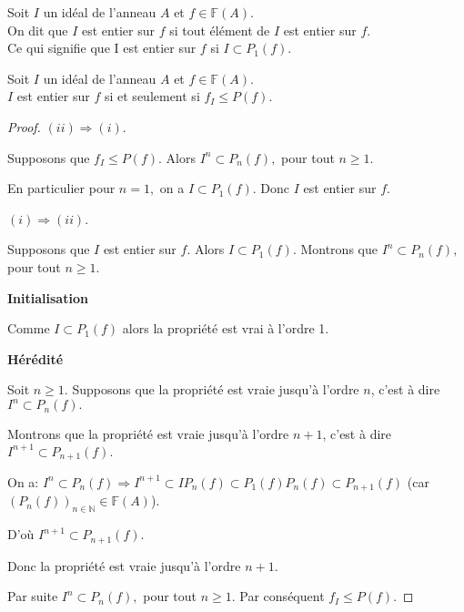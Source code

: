 \begin{madefinition}
	Soit $I$ un idéal de l'anneau $A$ et $f \in \mathbb{F}(A)$. \\
	On dit que $I$ est entier sur $f$ si tout élément de $I$ est entier sur $f$. \\
	Ce qui signifie que I est entier sur $f$ si $I \subset P_1(f)$.
\end{madefinition}
\begin{maconsequence}
	Soit $I$ un idéal de l'anneau $A$ et $f \in \mathbb{F}(A)$. \\
	$I$ est entier sur $f$ si et seulement si $f_I \leqslant P(f)$.
\end{maconsequence}
\begin{proof}
	$(ii)\Longrightarrow (i)$.
	
	Supposons que $f_{I}\leq P(f).$ Alors $I^{n}\subset P_{n}(f),$ pour tout $n\geq 1.$
	
	En particulier pour $n=1,$ on a $I\subset P_{1}(f).$ Donc $I$ est entier sur $f.$
	
	$(i)\Longrightarrow (ii)$.
	
	Supposons que $I$ est entier sur $f.$ Alors $I\subset P_{1}(f).$ Montrons que $I^{n}\subset P_{n}(f),$ pour tout $n\geq 1.$
	
	\textbf{Initialisation}
	
	Comme $I\subset P_{1}(f)$ alors la propriété est vrai à l'ordre 1.
	
	\textbf{Hérédité}
	
	Soit $n\geq 1.$ Supposons que la propriété est vraie jusqu'à l'ordre $n$, c'est à dire $I^{n}\subset P_{n}(f).$
	
	Montrons que la propriété est vraie jusqu'à l'ordre $n+1$, c'est à dire $I^{n+1}\subset P_{n+1}(f).$
	
	On a: $I^{n}\subset P_{n}(f)\Longrightarrow I^{n+1}\subset
	IP_{n}(f)\subset P_{1}(f)P_{n}(f)\subset P_{n+1}(f)$ (car $
	(P_{n}(f))_{n\in \mathbb{N}}\in \mathbb{F}(A)$).
	
	D'où $I^{n+1}\subset P_{n+1}(f).$
	
	Donc la propriété est vraie jusqu'à l'ordre $n+1.$
	
	Par suite $I^{n}\subset P_{n}(f),$ pour tout $n\geq 1.$ Par conséquent $f_{I}\leq P(f)$.
\end{proof}

